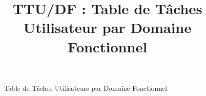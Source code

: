 

\title{TTU/DF : Table de Tâches Utilisateur par Domaine Fonctionnel}
\date{}


\maketitle

\begin{figure}[h!]
\begin{center}
    
\end{center}
\caption{Table de Tâches Utilisateurs par Domaine Fonctionnel}
\end{figure}


